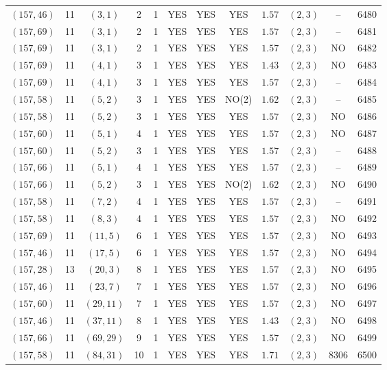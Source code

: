 \begin{longtable}{|c|c|c|c|c|c|c|c|c|c|c|c|}
$(157,46)$ & 11 & $(3,1)$ & 2 & 1 & YES & YES & YES & $1.57$ & $(2,3)$ & -- & 6480\\
$(157,69)$ & 11 & $(3,1)$ & 2 & 1 & YES & YES & YES & $1.57$ & $(2,3)$ & -- & 6481\\
$(157,69)$ & 11 & $(3,1)$ & 2 & 1 & YES & YES & YES & $1.57$ & $(2,3)$ & NO & 6482\\
$(157,69)$ & 11 & $(4,1)$ & 3 & 1 & YES & YES & YES & $1.43$ & $(2,3)$ & NO & 6483\\
$(157,69)$ & 11 & $(4,1)$ & 3 & 1 & YES & YES & YES & $1.57$ & $(2,3)$ & -- & 6484\\
$(157,58)$ & 11 & $(5,2)$ & 3 & 1 & YES & YES & NO(2) & $1.62$ & $(2,3)$ & -- & 6485\\
$(157,58)$ & 11 & $(5,2)$ & 3 & 1 & YES & YES & YES & $1.57$ & $(2,3)$ & NO & 6486\\
$(157,60)$ & 11 & $(5,1)$ & 4 & 1 & YES & YES & YES & $1.57$ & $(2,3)$ & NO & 6487\\
$(157,60)$ & 11 & $(5,2)$ & 3 & 1 & YES & YES & YES & $1.57$ & $(2,3)$ & -- & 6488\\
$(157,66)$ & 11 & $(5,1)$ & 4 & 1 & YES & YES & YES & $1.57$ & $(2,3)$ & -- & 6489\\
$(157,66)$ & 11 & $(5,2)$ & 3 & 1 & YES & YES & NO(2) & $1.62$ & $(2,3)$ & NO & 6490\\
$(157,58)$ & 11 & $(7,2)$ & 4 & 1 & YES & YES & YES & $1.57$ & $(2,3)$ & -- & 6491\\
$(157,58)$ & 11 & $(8,3)$ & 4 & 1 & YES & YES & YES & $1.57$ & $(2,3)$ & NO & 6492\\
$(157,69)$ & 11 & $(11,5)$ & 6 & 1 & YES & YES & YES & $1.57$ & $(2,3)$ & NO & 6493\\
$(157,46)$ & 11 & $(17,5)$ & 6 & 1 & YES & YES & YES & $1.57$ & $(2,3)$ & NO & 6494\\
$(157,28)$ & 13 & $(20,3)$ & 8 & 1 & YES & YES & YES & $1.57$ & $(2,3)$ & NO & 6495\\
$(157,46)$ & 11 & $(23,7)$ & 7 & 1 & YES & YES & YES & $1.57$ & $(2,3)$ & NO & 6496\\
$(157,60)$ & 11 & $(29,11)$ & 7 & 1 & YES & YES & YES & $1.57$ & $(2,3)$ & NO & 6497\\
$(157,46)$ & 11 & $(37,11)$ & 8 & 1 & YES & YES & YES & $1.43$ & $(2,3)$ & NO & 6498\\
$(157,66)$ & 11 & $(69,29)$ & 9 & 1 & YES & YES & YES & $1.57$ & $(2,3)$ & NO & 6499\\
$(157,58)$ & 11 & $(84,31)$ & 10 & 1 & YES & YES & YES & $1.71$ & $(2,3)$ & 8306 & 6500\\

\end{longtable}
